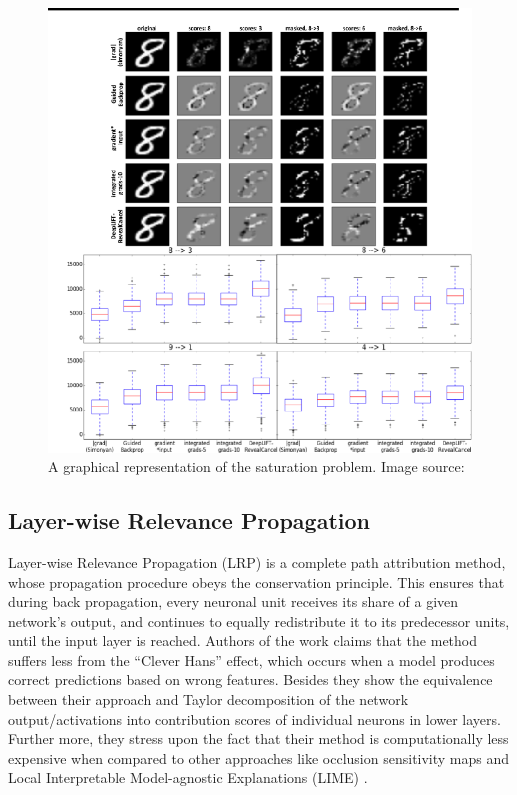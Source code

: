 \documentclass[../report.tex]{subfiles}
\begin{document}
 \begin{figure}[H]
 	\centering
	\includegraphics[scale=0.5, trim=0cm 0cm 0cm 1cm, clip]{images/chapter3/deep_lift_2.png}
	\caption{A graphical representation of the saturation problem. Image source: \cite{shrikumar2017learning}}
	\label{fig_deep_lift2}
\end{figure}


\subsection{Layer-wise Relevance Propagation}

Layer-wise Relevance Propagation (LRP) \cite{lrp} is a complete path attribution method, whose propagation procedure obeys the conservation principle. This ensures that during back propagation, every neuronal unit receives its share of a given network’s output, and continues to equally redistribute it to its predecessor units, until the input layer is reached. Authors of the work claims that the method suffers less from the \enquote{Clever Hans} effect, which occurs when a model produces correct predictions based on wrong features. Besides they show the equivalence between their approach and Taylor decomposition of the network output/activations into contribution scores of individual neurons in lower layers. Further more, they stress upon the fact that their method is computationally less expensive when compared to other approaches like occlusion sensitivity maps and Local Interpretable Model-agnostic Explanations (LIME) \cite{lime}.
\end{document}
